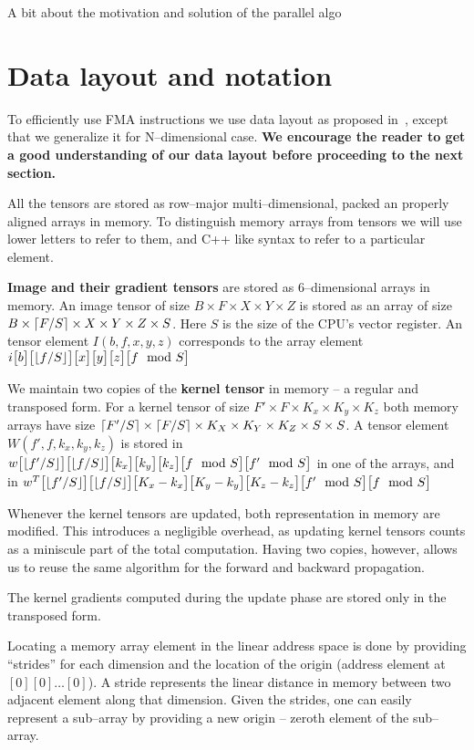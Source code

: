   A bit about the motivation and solution of the parallel algo

\section{Data layout and notation}

  To efficiently use FMA instructions we use data layout as proposed
  in~\cite{jeffers2016knl, cpu-myth}, except that we generalize it for
  N--dimensional case.  {\bf We encourage the reader to get a good
    understanding of our data layout before proceeding to the next
    section.}

  All the tensors are stored as row--major multi--dimensional, packed
  an properly aligned arrays in memory.  To distinguish memory arrays
  from tensors we will use lower letters to refer to them, and C++
  like syntax to refer to a particular element.

  {\bf Image and their gradient tensors} are stored as 6--dimensional
  arrays in memory.  An image tensor of size $B \times F \times X
  \times Y \times Z$ is stored as an array of size $B \times
  \lceil F/S\rceil \times X \times Y \times Z \times S$.  Here $S$ is the
  size of the CPU's vector register.  An tensor element $I(b,f,x,y,z)$
  corresponds to the array element
  $i\big[b\big]\big[\lfloor f/S\rfloor\big]\big[x\big]\big[y\big]\big[z\big]\big[f\mod S\big]$

  We maintain two copies of the {\bf kernel tensor} in memory -- a
  regular and transposed form.  For a kernel tensor of size $F' \times
  F \times K_x \times K_y \times K_z$ both memory arrays have size
  $\lceil F'/S\rceil \times \lceil F/S\rceil \times K_X \times K_Y \times K_Z
  \times S \times S$.  A tensor element $W(f',f,k_x,k_y,k_z)$ is
  stored in $w\big[\lfloor f'/S\rfloor\big]
  \big[\lfloor f/S\rfloor\big]\big[k_x\big]\big[k_y\big]\big[k_z\big]\big[f\mod S\big]\big[f'
    \mod S\big]$ in one of the arrays, and in $w^T\big[\lfloor f'/S\rfloor\big]
  \big[\lfloor f/S\rfloor\big]\big[K_x-k_x\big]\big[K_y-k_y\big]\big[K_z-k_z\big]\big[f'\mod
    S\big]\big[f\mod S\big]$

  Whenever the kernel tensors are updated, both representation in
  memory are modified.  This introduces a negligible overhead, as
  updating kernel tensors counts as a miniscule part of the total
  computation.  Having two copies, however, allows us to reuse the
  same algorithm for the forward and backward propagation.

  The kernel gradients computed during the update phase are stored
  only in the transposed form.

  Locating a memory array element in the linear address space is done
  by providing ``strides'' for each dimension and the location of the
  origin (address element at $[0][0]\dots[0]$).  A stride represents
  the linear distance in memory between two adjacent element along
  that dimension.  Given the strides, one can easily represent a
  sub--array by providing a new origin -- zeroth element of the
  sub--array.

